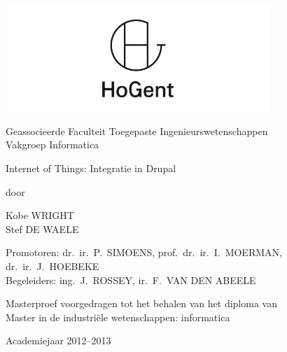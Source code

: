 

\begin{titlepage}

\setlength{\hoffset}{-1in}
\setlength{\voffset}{-1in}
\setlength{\topmargin}{1.5cm}
\setlength{\headheight}{0.5cm}
\setlength{\headsep}{1cm}
\setlength{\oddsidemargin}{3cm}
\setlength{\evensidemargin}{3cm}
\setlength{\footskip}{1.5cm}
\enlargethispage{1cm}

\fontsize{12pt}{14pt}
\selectfont

\begin{center}

\includegraphics[height=4cm]{fig/hogentLogo}

\vspace{0.5cm}

Geassocieerde Faculteit Toegepaste Ingenieurswetenschappen\\
Vakgroep Informatica

\vspace{3.5cm}

\fontsize{17.28pt}{21pt}
\selectfont

Internet of Things: Integratie in Drupal

\fontsize{12pt}{14pt}
\selectfont

\vspace{.6cm}

door 

\vspace{.4cm}

Kobe WRIGHT\\
Stef DE WAELE

\vspace{3.5cm}

Promotoren: dr.~ir.~P.~SIMOENS, prof.~dr.~ir.~I.~MOERMAN, dr.~ir.~J.~HOEBEKE\\
Begeleiders: ing.~J.~ROSSEY, ir.~F.~VAN DEN ABEELE\\

\vspace{2cm}

Masterproef voorgedragen tot het behalen van het diploma van\\
Master in de industriële wetenschappen: informatica

\vspace{1cm}

Academiejaar 2012--2013

\end{center}
\end{titlepage}
